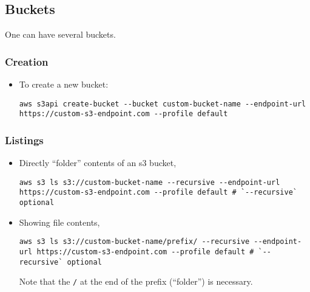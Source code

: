 \documentclass[12pt, a4paper]{article}
\numberwithin{equation}{section}
\theoremstyle{definition}
\theoremstyle{definition}
\begin{document}
	\subsection{Buckets}
	
	One can have several buckets. 
	
	\subsubsection{Creation}

	\begin{itemize}
		
		\item To create a new bucket:
		
		\begin{lstlisting}[style=mystylebash, label=alg:aws__new_bucket, xleftmargin=\parindent]
			aws s3api create-bucket --bucket custom-bucket-name --endpoint-url https://custom-s3-endpoint.com --profile default
		\end{lstlisting}
	
	\end{itemize} 

	\subsubsection{Listings}

	\begin{itemize} 
		
		\item Directly \enquote{folder} contents of an s3 bucket,
		
		\begin{lstlisting}[style=mystylebash, label=alg:aws__bucket_ls, xleftmargin=\parindent]
			aws s3 ls s3://custom-bucket-name --recursive --endpoint-url https://custom-s3-endpoint.com --profile default # `--recursive` optional
		\end{lstlisting}
		
		\item Showing file contents,
		
		\begin{lstlisting}[style=mystylebash, label=alg:aws__bucket_prefix_ls, xleftmargin=\parindent]
			aws s3 ls s3://custom-bucket-name/prefix/ --recursive --endpoint-url https://custom-s3-endpoint.com --profile default # `--recursive` optional
		\end{lstlisting}
	
		Note that the \texttt{/} at the end of the prefix (\enquote{folder}) is necessary.
		
	\end{itemize}
\end{document}
